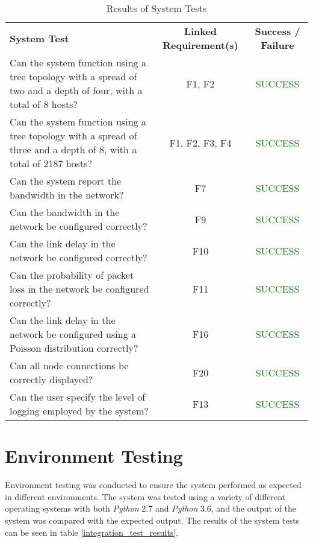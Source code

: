 \begin{table}[t]
  \caption{Results of System Tests}
  \begin{center}
    \begin{tabularx}{\textwidth}{|Y|c|c|} \hline
      \textbf{System Test} & \textbf{Linked Requirement(s)} & \textbf{Success / Failure} \\ \thickhline
        Can the system function using a tree topology with a spread of two and a depth of four, with a total of 8 hosts? & F1, F2 & \textcolor{green}{SUCCESS} \\ \hline
        Can the system function using a tree topology with a spread of three and a depth of 8, with a total of 2187 hosts? & F1, F2, F3, F4 & \textcolor{green}{SUCCESS} \\ \hline
        Can the system report the bandwidth in the network? & F7 & \textcolor{green}{SUCCESS} \\ \hline
        Can the bandwidth in the network be configured correctly? & F9 & \textcolor{green}{SUCCESS} \\ \hline
        Can the link delay in the network be configured correctly? & F10 & \textcolor{green}{SUCCESS} \\ \hline
        Can the probability of packet loss in the network be configured correctly? & F11 & \textcolor{green}{SUCCESS} \\ \hline
        Can the link delay in the network be configured using a Poisson distribution correctly? & F16 & \textcolor{green}{SUCCESS} \\ \hline
        Can all node connections be correctly displayed? & F20 & \textcolor{green}{SUCCESS} \\ \hline
        Can the user specify the level of logging employed by the system? & F13 & \textcolor{green}{SUCCESS} \\ \hline

    \end{tabularx}
  \end{center}
  \label{system_test_results}
\end{table}


\section{Environment Testing}
\label{environment_testing}
Environment testing was conducted to ensure the system performed as expected in different environments.
The system was tested using a variety of different operating systems with both \textit{Python} 2.7 and \textit{Python} 3.6, and the output of the system was compared with the expected output.
The results of the system tests can be seen in table \ref{integration_test_results}.

